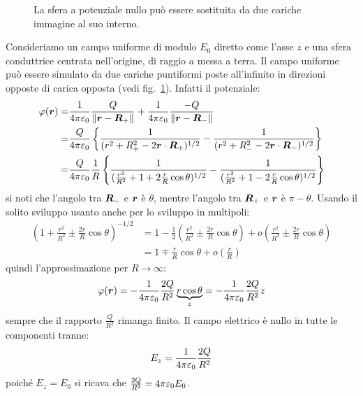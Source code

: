 \begin{Es}
  \begin{figure}[htbp]
    \centering
    
    \caption{La sfera a potenziale nullo può essere sostituita da due cariche immagine al suo interno.}
    \label{fig:esempio_campo_sfera}
  \end{figure}

  Consideriamo un campo uniforme di modulo $E_0$ diretto come l'asse $z$ e una sfera conduttrice centrata nell'origine, di raggio $a$ messa a terra. Il campo uniforme può essere simulato da due cariche puntiformi poste all'infinito in direzioni opposte di carica opposta (vedi fig.~\ref{fig:esempio_campo_sfera}). Infatti il potenziale:
  \[
    \begin{aligned}
      \varphi(\boldsymbol{r})= & \frac{1}{4\pi\varepsilon_0}\frac{Q}{\left\lVert\boldsymbol{r} - \boldsymbol{R}_+\right\rVert}+\frac{1}{4\pi\varepsilon_0}\frac{-Q}{\left\lVert\boldsymbol{r}-\boldsymbol{R}_-\right\rVert}                                                               \\
      =               & \frac{Q}{4\pi\varepsilon_0}\left\{\frac{1}{(r^2+R^2_+-2\boldsymbol{r}\cdot \boldsymbol{R}_+)^{1/2}}-\frac{1}{(r^2+R_-^2-2\boldsymbol{r}\cdot\boldsymbol{R}_-)^{1/2}}\right\}                                   \\
      =               & \frac{Q}{4\pi\varepsilon_0}\frac{1}{R}\left\{\frac{1}{(\frac{r^2}{R^2}+1+2\frac{r}{R}\cos\theta)^{1/2}}-\frac{1}{(\frac{r^2}{R^2}+1-2\frac{r}{R}\cos\theta)^{1/2}}\right\}
    \end{aligned}
  \]
  si noti che l'angolo tra $\boldsymbol{R}_-$ e $\boldsymbol{r}$ è $\theta$, mentre l'angolo tra $\boldsymbol{R}_+$ e $\boldsymbol{r}$ è $\pi-\theta$. Usando il solito sviluppo usanto anche per lo sviluppo in multipoli:
  \[
    \begin{aligned}
      \left(1+\frac{r^2}{R^2}\pm\frac{2r}{R}\cos\theta\right)^{-1/2} & =1-\frac{1}{2}\left(\frac{r^2}{R^2}\pm\frac{2r}{R}\cos\theta\right)+o\left(\frac{r^2}{R^2}\pm\frac{2r}{R}\cos\theta\right) \\
                                                                     & =1\mp\frac{r}{R}\cos\theta+o\left(\frac{r}{R}\right)
    \end{aligned}
  \]
  quindi l'approssimazione per $R\to\infty$:
  \[
    \varphi(\boldsymbol{r})=-\frac{1}{4\pi\varepsilon_0}\frac{2Q}{R^2}\underbrace{r\cos\theta}_z=-\frac{1}{4\pi\varepsilon_0}\frac{2Q}{R^2}z
  \]
  sempre che il rapporto $\frac{Q}{R^2}$ rimanga finito. Il campo elettrico è nullo in tutte le componenti tranne:
  \[
    E_z = \frac{1}{4\pi\varepsilon_0}\frac{2Q}{R^2}
  \]
  poiché $E_z=E_0$ si ricava che $\frac{2Q}{R^2} = 4\pi\varepsilon_0 E_0$.


\end{Es}
